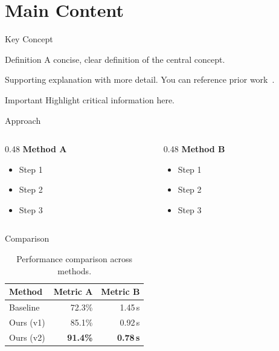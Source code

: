 \section{Main Content}

\begin{frame}{Key Concept}
  \begin{block}{Definition}
    A concise, clear definition of the central concept.
  \end{block}

  \vspace{0.5em}
  Supporting explanation with more detail. You can reference
  prior work~\parencite{example2024}.

  \begin{alertblock}{Important}
    Highlight critical information here.
  \end{alertblock}
\end{frame}

\begin{frame}{Approach}
  \begin{columns}[T]
    \begin{column}{0.48\textwidth}
      \textbf{Method A}
      \begin{itemize}
        \item Step 1
        \item Step 2
        \item Step 3
      \end{itemize}
    \end{column}
    \hfill
    \begin{column}{0.48\textwidth}
      \textbf{Method B}
      \begin{itemize}
        \item Step 1
        \item Step 2
        \item Step 3
      \end{itemize}
    \end{column}
  \end{columns}
\end{frame}

\begin{frame}{Comparison}
  \begin{table}
    \centering
    \begin{tabular}{lrr}
      \toprule
      Method      & Metric A & Metric B \\
      \midrule
      Baseline    & 72.3\%   & 1.45\,s  \\
      Ours (v1)   & 85.1\%   & 0.92\,s  \\
      Ours (v2)   & \textbf{91.4\%} & \textbf{0.78\,s} \\
      \bottomrule
    \end{tabular}
    \caption{Performance comparison across methods.}
  \end{table}
\end{frame}


